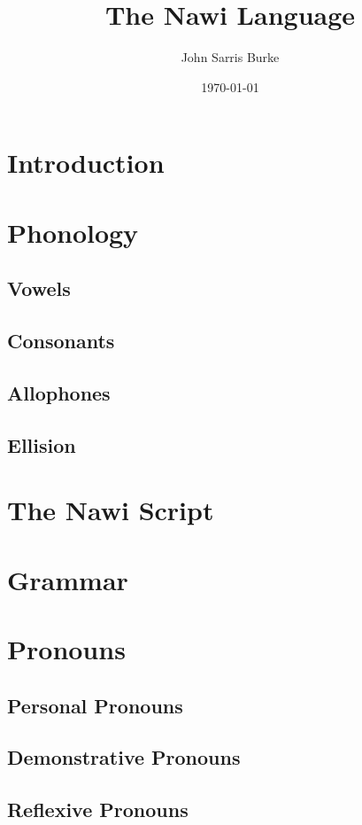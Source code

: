 \documentclass[10pt]{article}
\title{The Nawi Language}
\date{\today}
\author{John Sarris Burke}
\begin{document}
\maketitle

\tableofcontents

\pagebreak

\listoftables
\listoffigures

\pagebreak

\section{Introduction}
\section{Phonology}
	\subsection{Vowels}
	\subsection{Consonants}
	\subsection{Allophones}
	\subsection{Ellision}
\section{The Nawi Script}
\section{Grammar}
\section{Pronouns}
	\subsection{Personal Pronouns}
	\subsection{Demonstrative Pronouns}
	\subsection{Reflexive Pronouns}
\end{document}
